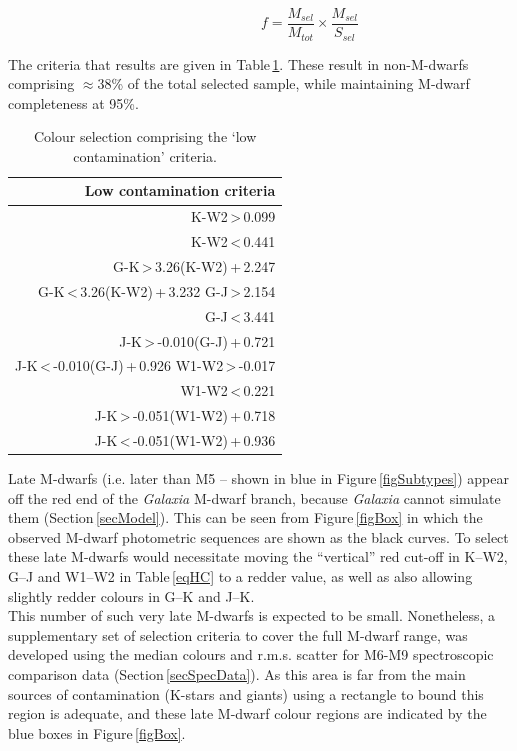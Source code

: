 \begin{equation}
\hspace{3cm}f = \frac{M_{sel}}{M_{tot}} \times \frac{M_{sel}}{S_{sel}}
\label{eqFrac}
\end{equation}

The criteria that results are given in Table\,\ref{eqLC}. These result in non-M-dwarfs comprising $\approx$38\% of the total selected sample, while maintaining M-dwarf completeness at 95\%.\\


\begin{table}[]
    \centering
    \begin{tabular}{|r|}
        \hline
        Low contamination criteria\\
        \hline
        K-W2\,\textgreater\,0.099\\
        K-W2\,\textless\,0.441\\
        G-K\,\textgreater\,3.26(K-W2)\,+\,2.247\\
        G-K\,\textless\,3.26(K-W2)\,+\,3.232
        G-J\,\textgreater\,2.154\\
        G-J\,\textless\,3.441\\
        J-K\,\textgreater\,-0.010(G-J)\,+\,0.721\\
        J-K\,\textless\,-0.010(G-J)\,+\,0.926
	    W1-W2\,\textgreater\,-0.017\\
        W1-W2\,\textless\,0.221\\
        J-K\,\textgreater\,-0.051(W1-W2)\,+\,0.718\\
        J-K\,\textless\,-0.051(W1-W2)\,+\,0.936\\
        \hline
    \end{tabular}
    \caption{Colour selection comprising the `low contamination' criteria.}
    \label{eqLC}
\end{table}

Late M-dwarfs (i.e. later than M5 -- shown in blue in Figure\,\ref{figSubtypes}) appear off the red end of the {\em Galaxia} M-dwarf branch, because {\em Galaxia} cannot simulate them (Section\,\ref{secModel}). This can be seen from Figure\,\ref{figBox} in which the observed M-dwarf photometric sequences are shown as the black curves. To select these late M-dwarfs would necessitate moving the ``vertical'' red cut-off in K--W2, G--J and W1--W2 in Table\,\ref{eqHC} to a redder value, as well as also allowing slightly redder colours in G--K and J--K. \\

This number of such very late M-dwarfs is expected to be small. Nonetheless, a supplementary set of selection criteria to cover the full M-dwarf range, was developed using the median colours and r.m.s. scatter for M6-M9 spectroscopic comparison data (Section\,\ref{secSpecData}). As this area is far from the main sources of contamination (K-stars and giants) using a rectangle to bound this region is adequate, and these late M-dwarf colour regions are indicated by the blue boxes in Figure\,\ref{figBox}.\\

